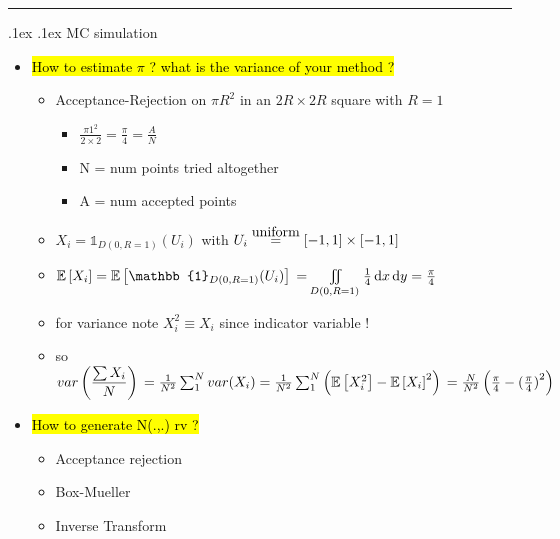 \documentclass[10pt,landscape,a4paper]{article}
\makeatletter
\renewcommand{\section}{\@startsection{section}{1}{0mm}%
                                {.1ex}%
                                {.1ex}%
                                {\color{blue}\sffamily\small\bfseries}}
\newcommand{\myE}[1]{ \mathbb{E} \left[ #1 \right] }
\newcommand\myeq[1]{\stackrel{{\normalfont\mbox{#1}}}{ = }}
\newcommand{\mylp}{ \left ( }
\newcommand{\myrp}{ \right ) }
\newcommand*\dif{\mathop{}\!\mathrm{d}}
\makeatother
\begin{document}
\begin{multicols*}{4}
\begin{spacing}{0.1}
\begin{itemize}
\end{itemize}

\hrule
\section {MC simulation}

\begin{itemize}
	
\item \hl{How to estimate $\pi$ ? what is the variance of your method ?}
\begin{itemize}
	\item Acceptance-Rejection on $\pi R^2$ in an $2R \times 2R$ square with $R=1$
	\begin{itemize}
	\item $\frac{\pi 1^2}{2 \times 2}=\frac{\pi}{4}= \frac{A}{N}$
	\item N = num points tried altogether
	\item A = num accepted points
	\end{itemize}
	\item $X_i = \mathbb{1}_{D(0,R=1)} (U_i)$ with $U_i \myeq{uniform} [-1,1] \times [-1,1]$ 
	\item $\myE{X_i} = \myE{\mathbb{1}_{D(0,R=1)} (U_i)} \\ =\iint\limits_{D(0,R=1)} \frac{1}{4}  \dif x \dif y = \frac{\pi}{4} $ 
	\item  for variance note $X^2_i \equiv X_i$ since indicator variable !
	\item so $var \mylp \dfrac{\sum X_i}{N}\myrp  \\= \frac{1}{N^2} \sum_1^N var(X_i) \\= \frac{1}{N^2} \sum_1^N \mylp \myE{X_i^2} - {\myE{X_i}}^2 \myrp \\= \frac{N}{N^2} \mylp \frac{\pi}{4} - {(\frac{\pi}{4})}^2 \myrp $ 
\end{itemize}

\item \hl{How to generate N(.,.) rv ?}
\begin{itemize}
\item Acceptance rejection
\item Box-Mueller
\item Inverse Transform
\end{itemize}


\end{itemize}
\end{spacing}
\end{multicols*}
\end{document}
